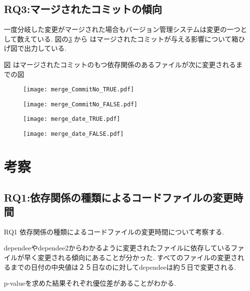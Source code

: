 \documentclass[submit,ses,noauthor]{ipsj} %
\begin{document}
\subsection{RQ3:マージされたコミットの傾向}
一度分岐した変更がマージされた場合もバージョン管理システムは変更の一つとして数えている.
図の\ref{fig:merge_true_subNo} から はマージされたコミットが与える影響について箱ひげ図で出力している.

図\label{fig:merge_true_subNo} はマージされたコミットのもつ依存関係のあるファイルが次に変更されるまでの図




\begin{figure}
\centering
\texttt{[image: merge\_CommitNo\_TRUE.pdf]}
\caption{}
\label{fig:merge_true_subNo} 
\end{figure}

\begin{figure}
\centering
\texttt{[image: merge\_CommitNo\_FALSE.pdf]}
\caption{}
\label{fig:merge_false_subNo} 
\end{figure}



\begin{figure}
\centering
\texttt{[image: merge\_date\_TRUE.pdf]}
\caption{}
\label{fig:merge_true_subNo} 
\end{figure}

\begin{figure}
\centering
\texttt{[image: merge\_date\_FALSE.pdf]}
\caption{}
\label{fig:merge_false_subNo} 
\end{figure}


\section{考察}\label{考察}
\subsection{RQ1:依存関係の種類によるコードファイルの変更時間}

RQ1 依存関係の種類によるコードファイルの変更時間について考察する.

dependeeやdependee2からわかるように変更されたファイルに依存しているファイルが早く変更される傾向にあることが分かった.
すべてのファイルの変更されるまでの日付の中央値は２５日なのに対してdependeeは約５日で変更される.

p-valueを求めた結果それぞれ優位差があることがわかる.
\end{document}
